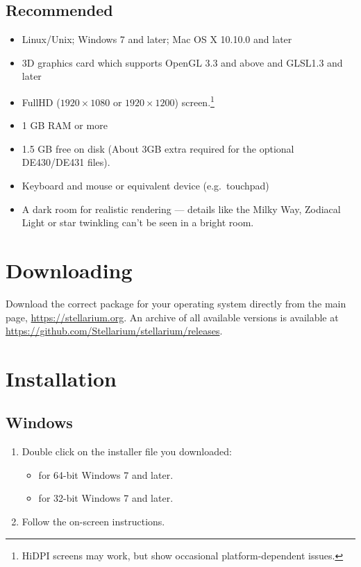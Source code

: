 \subsection{Recommended}
\begin{itemize}
\item Linux/Unix; Windows 7 and later; Mac OS X 10.10.0 and later
\item 3D graphics card which supports OpenGL 3.3 and above and GLSL1.3 and later
\item FullHD ($1920\times1080$ or $1920\times1200$) screen.\footnote{HiDPI screens may work, but show occasional platform-dependent issues.}
\item 1 GB RAM or more
\item 1.5 GB free on disk (About 3GB extra required for the optional DE430/DE431 files).
\item Keyboard and mouse or equivalent device (e.g.\ touchpad)
\item A dark room for realistic rendering --- details like the Milky Way, Zodiacal Light 
      or star twinkling can't be seen in a bright room.
\end{itemize}


\section{Downloading}
\label{sec:GettingStarted:Downloading}

Download the correct package for your operating system directly from the main page, \newline \url{https://stellarium.org}.
An archive of all available versions is available at \url{https://github.com/Stellarium/stellarium/releases}.

\section{Installation}
\label{sec:GettingStarted:Installation}

\subsection{Windows}
\label{sec:GettingStarted:Installation:Windows}

\begin{enumerate}
\item Double click on the installer file you downloaded:
\begin{itemize}
\item {} for 64-bit Windows 7 and later.
\item {} for 32-bit Windows 7 and later.
\end{itemize}
\item Follow the on-screen instructions.
\end{enumerate}

